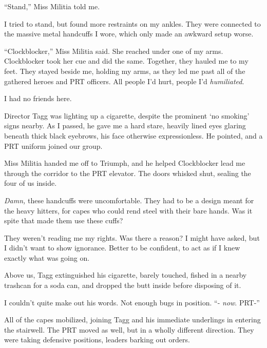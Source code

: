 ``Stand,'' Miss Militia told me.



I tried to stand, but found more restraints on my ankles.  They were connected to the massive metal handcuffs I wore, which only made an awkward setup worse.



``Clockblocker,'' Miss Militia said.  She reached under one of my arms.  Clockblocker took her cue and did the same.  Together, they hauled me to my feet.  They stayed beside me, holding my arms, as they led me past all of the gathered heroes and PRT officers.  All people I'd hurt, people I'd \emph{humiliated}.



I had no friends here.



Director Tagg was lighting up a cigarette, despite the prominent `no smoking' signs nearby.  As I passed, he gave me a hard stare, heavily lined eyes glaring beneath thick black eyebrows, his face otherwise expressionless.  He pointed, and a PRT uniform joined our group.



Miss Militia handed me off to Triumph, and he helped Clockblocker lead me through the corridor to the PRT elevator.  The doors whisked shut, sealing the four of us inside.



\emph{Damn, }these handcuffs were uncomfortable.  They had to be a design meant for the heavy hitters, for capes who could rend steel with their bare hands.  Was it spite that made them use these cuffs?



They weren't reading me my rights.  Was there a reason?  I might have asked, but I didn't want to show ignorance.  Better to be confident, to act as if I knew exactly what was going on.



Above us, Tagg extinguished his cigarette, barely touched, fished in a nearby trashcan for a soda can, and dropped the butt inside before disposing of it.



I couldn't quite make out his words.  Not enough bugs in position.  ``- \emph{now}.  PRT-''



All of the capes mobilized, joining Tagg and his immediate underlings in entering the stairwell.  The PRT moved as well, but in a wholly different direction.  They were taking defensive positions, leaders barking out orders.



